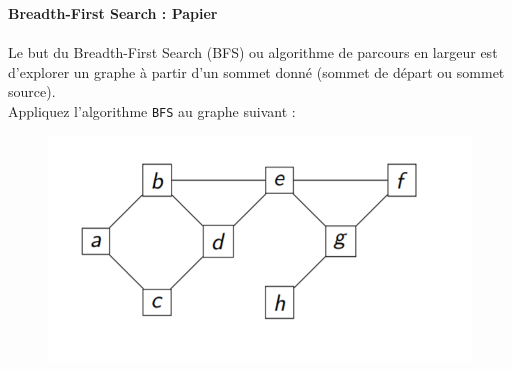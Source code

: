 \begin{Exercice}[5 minutes]\textbf{Breadth-First Search : Papier
}\\
\\
	Le but du Breadth-First Search (BFS) ou algorithme de parcours en largeur est d'explorer un graphe à partir d’un sommet donné (sommet de départ ou sommet source). \\

	Appliquez l’algorithme \lstinline{BFS} au graphe suivant :\\

	\begin{figure}[h!]
        		\centering
       	 	\includegraphics[]{resources/exerciceBFS.png}
	\end{figure}



\end{Exercice}
